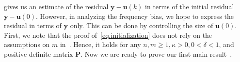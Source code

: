 
 gives us an estimate of the residual $\mathbf{y} - \mathbf{u}(k)$ in terms of the initial residual $\mathbf{y} - \mathbf{u}(0)$. However, in analyzing the frequency bias, we hope to express the residual in terms of $\mathbf{y}$ only. This can be done by controlling the size of $\mathbf{u}(0)$. First, we note that the proof of~\cref{eq.initialization} does not rely on the assumptions on $m$ in~. Hence, it holds for any $n, m \geq 1, \kappa > 0, 0 < \delta < 1$, and positive definite matrix $\mathbf{P}$. Now we are ready to prove our first main result~.

